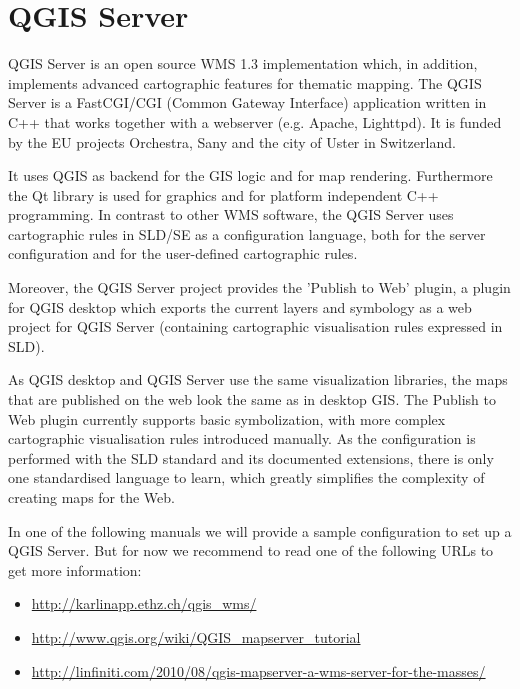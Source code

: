 
\chapter{QGIS Server}\label{label_qgisserver}


QGIS Server is an open source WMS 1.3 implementation which, in addition,
implements advanced cartographic features for thematic mapping. The QGIS
Server is a FastCGI/CGI (Common Gateway Interface) application written in
C++ that works together with a webserver (e.g. Apache, Lighttpd). It is 
funded by the EU projects Orchestra, Sany and the city of Uster in 
Switzerland.

It uses QGIS as backend for the GIS logic and for map rendering. Furthermore the 
Qt library is used for graphics and for platform independent 
C++ programming. In contrast to other WMS software, the QGIS Server uses 
cartographic rules in SLD/SE as a configuration language, both for the server 
configuration and for the user-defined cartographic rules. 

Moreover, the QGIS Server project provides the 'Publish to Web' plugin, a 
plugin for QGIS desktop which exports the current layers and symbology as a 
web project for QGIS Server (containing cartographic visualisation rules 
expressed in SLD).

As QGIS desktop and QGIS Server use the same visualization libraries, the
maps that are published on the web look the same as in desktop GIS. The 
Publish to Web plugin currently supports basic symbolization, with more complex 
cartographic visualisation rules introduced manually. As the configuration is 
performed with the SLD standard and its documented extensions, there is only 
one standardised language to learn, which greatly simplifies the complexity 
of creating maps for the Web.

In one of the following manuals we will provide a sample configuration to 
set up a QGIS Server. But for now we recommend to read one of the following 
URLs to get more information:

\begin{itemize}
\item \url{http://karlinapp.ethz.ch/qgis\_wms/} \\
\item \url{http://www.qgis.org/wiki/QGIS\_mapserver\_tutorial} \\
\item \url{http://linfiniti.com/2010/08/qgis-mapserver-a-wms-server-for-the-masses/}
\end{itemize}

